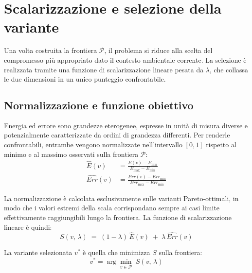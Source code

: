 \section{Scalarizzazione e selezione della variante}
\label{sec:scalarizzazione}

Una volta costruita la frontiera $\mathcal{P}$, il problema si riduce
alla scelta del compromesso più appropriato dato il contesto
ambientale corrente. La selezione è realizzata tramite una
funzione di scalarizzazione lineare pesata da $\lambda$, che collassa
le due dimensioni in un unico punteggio confrontabile.

\subsection{Normalizzazione e funzione obiettivo}
\label{sec:scalarizzazione:funzione}

Energia ed errore sono grandezze eterogenee, espresse in unità di
misura diverse e potenzialmente caratterizzate da ordini di grandezza
differenti. Per renderle confrontabili, entrambe vengono normalizzate
nell'intervallo $[0,1]$ rispetto al minimo e al massimo osservati
sulla frontiera $\mathcal{P}$:
%
\begin{align}
    \hat{E}(v) &= \frac{E(v) - E_{\min}}{E_{\max} - E_{\min}}
    \label{eq:norm_energy} \\[4pt]
    \widehat{\mathit{Err}}(v) &=
        \frac{\mathit{Err}(v) - \mathit{Err}_{\min}}
             {\mathit{Err}_{\max} - \mathit{Err}_{\min}}
    \label{eq:norm_error}
\end{align}

La normalizzazione è calcolata esclusivamente sulle varianti
Pareto-ottimali, in modo che i valori estremi della scala
corrispondano sempre ai casi limite effettivamente raggiungibili
lungo la frontiera. La funzione di scalarizzazione lineare è quindi:
%
\begin{equation}
    S(v,\,\lambda) \;=\;
        (1 - \lambda)\,\hat{E}(v) \;+\;
        \lambda\,\widehat{\mathit{Err}}(v)
    \label{eq:scalarizzazione}
\end{equation}

La variante selezionata $v^*$ è quella che minimizza $S$ sulla
frontiera:
%
\begin{equation}
    v^* = \arg\min_{v \in \mathcal{P}}\; S(v,\,\lambda)
    \label{eq:selezione_carbon}
\end{equation}

